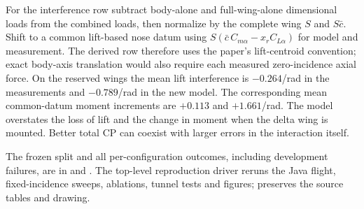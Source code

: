 For the interference row subtract body-alone and full-wing-alone dimensional loads from the combined loads, then normalize by the complete wing $S$ and $S\bar c$. Shift to a common lift-based nose datum using $S(\bar c\,C_{m\alpha}-x_r C_{L\alpha})$ for model and measurement. The derived row therefore uses the paper's lift-centroid convention; exact body-axis translation would also require each measured zero-incidence axial force. On the reserved wings the mean lift interference is $-0.264$/rad in the measurements and $-0.789$/rad in the new model. The corresponding mean common-datum moment increments are $+0.113$ and $+1.661$/rad. The model overstates the loss of lift and the change in moment when the delta wing is mounted. Better total CP can coexist with larger errors in the interaction itself.

The frozen split and all per-configuration outcomes, including development failures, are in  and . The top-level reproduction driver reruns the Java flight, fixed-incidence sweeps, ablations, tunnel tests and figures;  preserves the source tables and drawing.
